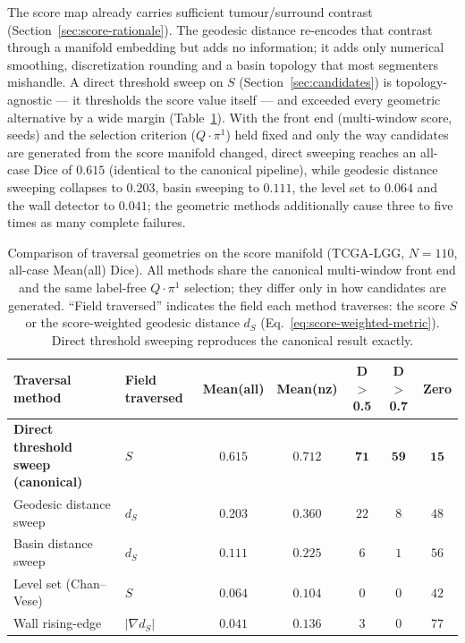 \documentclass[11pt,a4paper]{article}
\begin{document}
The score map already carries sufficient tumour/surround contrast
(Section~\ref{sec:score-rationale}). The geodesic distance re-encodes that contrast
through a manifold embedding but adds no information; it adds only numerical
smoothing, discretization rounding and a basin topology that most segmenters
mishandle. A direct threshold sweep on $S$ (Section~\ref{sec:candidates}) is
topology-agnostic --- it thresholds the score value itself --- and exceeded every
geometric alternative by a wide margin (Table~\ref{tab:traversal}). With the front
end (multi-window score, seeds) and the selection criterion ($Q\cdot\pi^1$) held
fixed and only the way candidates are generated from the score manifold changed,
direct sweeping reaches an all-case Dice of $0.615$ (identical to the canonical
pipeline), while geodesic distance sweeping collapses to $0.203$, basin sweeping to
$0.111$, the level set to $0.064$ and the wall detector to $0.041$; the geometric
methods additionally cause three to five times as many complete failures.

\begin{table}[htpb!]\centering
\caption{Comparison of traversal geometries on the score manifold (TCGA-LGG,
$N{=}110$, all-case Mean(all) Dice). All methods share the canonical multi-window
front end and the same label-free $Q\cdot\pi^1$ selection; they differ only in how
candidates are generated. ``Field traversed'' indicates the field each method
traverses: the score $S$ or the score-weighted geodesic distance $d_S$
(Eq.~\ref{eq:score-weighted-metric}). Direct threshold sweeping reproduces the
canonical result exactly.}
\label{tab:traversal}
\begin{tabular}{llccccc}
\toprule
Traversal method & Field traversed & Mean(all) & Mean(nz) & D$>$0.5 & D$>$0.7 & Zero \\
\midrule
\textbf{Direct threshold sweep (canonical)} & $S$ & $\mathbf{0.615}$ & $0.712$ & $\mathbf{71}$ & $\mathbf{59}$ & $\mathbf{15}$ \\
Geodesic distance sweep & $d_S$ & $0.203$ & $0.360$ & $22$ & $8$ & $48$ \\
Basin distance sweep & $d_S$ & $0.111$ & $0.225$ & $6$ & $1$ & $56$ \\
Level set (Chan--Vese) & $S$ & $0.064$ & $0.104$ & $0$ & $0$ & $42$ \\
Wall rising-edge & $\lvert\nabla d_S\rvert$ & $0.041$ & $0.136$ & $3$ & $0$ & $77$ \\
\bottomrule
\end{tabular}
\end{table}
\end{document}
